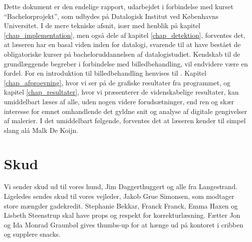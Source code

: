 {
{\sffamily Dette dokument er den endelige rapport, udarbejdet i
forbindelse med kurset ``Bachelorprojekt'', som udbydes på Datalogisk
Institut ved Københavns Universitet. I de mere tekniske afsnit, især med
henblik på kapitel \ref{chap_implementation}, men også dele af kapitel
\ref{chap_detektion}, forventes det, at læseren har en basal viden inden
for datalogi, svarende til at have bestået de obligatoriske kurser på
bacheloruddannelsen af datalogistudiet\cite{DIKUkurser}. Kendskab til de
grundlæggende begreber i forbindelse med billedbehandling, vil endvidere
være en fordel. For en introduktion til billedbehandling henvises til
\cite{SIOlsen}. Kapitel \ref{chap_afproevning}, hvor vi ser på de
grafiske resultater fra programmet, og kapitel \ref{chap_resultater},
hvor vi præsenterer de videnskabelige resultater, kan umiddelbart læses
af alle, uden nogen videre forudsætninger, end ren og skær interesse for
emnet omhandlende det gyldne snit og analyse af digitale gengivelser af
malerier. I det umiddelbart følgende, forventes det at læseren kender
til simpel slang alá Malk De Koijn.

\section*{Skud}
Vi sender skud ud til vores hund, Jim Daggerthuggert og alle fra
Langestrand. Ligeledes sendes skud til vores vejleder, Jakob Grue
Simonsen, som modtager store mængder gadekredit. Stephanie Bekkar,
Franck Franck, Emma Haxen og Lisbeth Steenstrup skal have props
og respekt for korrekturlæsning. Fætter Jon og Ida Monrad Graunbøl gives
thumbs-up for at hænge ud på kontoret i cribben og supplere snacks.

}
}

